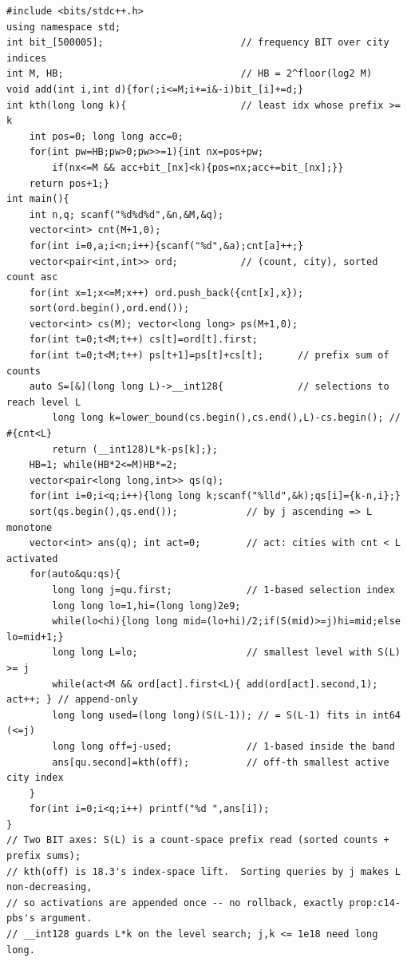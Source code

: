 \begin{lstlisting}[caption={CF 1181D: sort counts, search the water level, lift the offset-th active city}, label={lst:c14-summit}]
#include <bits/stdc++.h>
using namespace std;
int bit_[500005];                        // frequency BIT over city indices
int M, HB;                               // HB = 2^floor(log2 M)
void add(int i,int d){for(;i<=M;i+=i&-i)bit_[i]+=d;}
int kth(long long k){                    // least idx whose prefix >= k
    int pos=0; long long acc=0;
    for(int pw=HB;pw>0;pw>>=1){int nx=pos+pw;
        if(nx<=M && acc+bit_[nx]<k){pos=nx;acc+=bit_[nx];}}
    return pos+1;}
int main(){
    int n,q; scanf("%d%d%d",&n,&M,&q);
    vector<int> cnt(M+1,0);
    for(int i=0,a;i<n;i++){scanf("%d",&a);cnt[a]++;}
    vector<pair<int,int>> ord;           // (count, city), sorted count asc
    for(int x=1;x<=M;x++) ord.push_back({cnt[x],x});
    sort(ord.begin(),ord.end());
    vector<int> cs(M); vector<long long> ps(M+1,0);
    for(int t=0;t<M;t++) cs[t]=ord[t].first;
    for(int t=0;t<M;t++) ps[t+1]=ps[t]+cs[t];      // prefix sum of counts
    auto S=[&](long long L)->__int128{             // selections to reach level L
        long long k=lower_bound(cs.begin(),cs.end(),L)-cs.begin(); // #{cnt<L}
        return (__int128)L*k-ps[k];};
    HB=1; while(HB*2<=M)HB*=2;
    vector<pair<long long,int>> qs(q);
    for(int i=0;i<q;i++){long long k;scanf("%lld",&k);qs[i]={k-n,i};}
    sort(qs.begin(),qs.end());            // by j ascending => L monotone
    vector<int> ans(q); int act=0;        // act: cities with cnt < L activated
    for(auto&qu:qs){
        long long j=qu.first;             // 1-based selection index
        long long lo=1,hi=(long long)2e9;
        while(lo<hi){long long mid=(lo+hi)/2;if(S(mid)>=j)hi=mid;else lo=mid+1;}
        long long L=lo;                   // smallest level with S(L) >= j
        while(act<M && ord[act].first<L){ add(ord[act].second,1); act++; } // append-only
        long long used=(long long)(S(L-1)); // = S(L-1) fits in int64 (<=j)
        long long off=j-used;             // 1-based inside the band
        ans[qu.second]=kth(off);          // off-th smallest active city index
    }
    for(int i=0;i<q;i++) printf("%d ",ans[i]);
}
// Two BIT axes: S(L) is a count-space prefix read (sorted counts + prefix sums);
// kth(off) is 18.3's index-space lift.  Sorting queries by j makes L non-decreasing,
// so activations are appended once -- no rollback, exactly prop:c14-pbs's argument.
// __int128 guards L*k on the level search; j,k <= 1e18 need long long.
\end{lstlisting}

